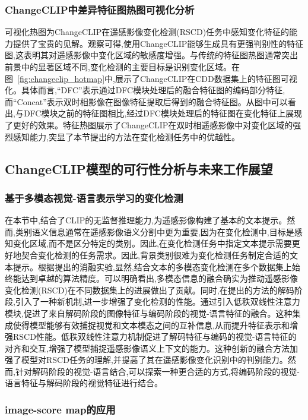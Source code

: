 \subsubsection{ChangeCLIP中差异特征图热图可视化分析}

可视化热图为ChangeCLIP在遥感影像变化检测(RSCD)任务中感知变化特征的能力提供了宝贵的见解。观察可得,使用ChangeCLIP能够生成具有更强判别性的特征图,这表明其对遥感影像中变化区域的敏感度增强。与传统的特征图热图通常突出前景中的显著区域不同,变化检测的主要目标是识别变化区域。在图~\ref{fig:changeclip_hotmap}中,展示了ChangeCLIP在CDD数据集上的特征图可视化。具体而言,``DFC''表示通过DFC模块处理后的融合特征图的编码部分特征,而``Concat''表示双时相影像在图像特征提取后得到的融合特征图。从图中可以看出,与DFC模块之前的特征图相比,经过DFC模块处理后的特征图在变化特征上展现了更好的效果。特征热图展示了ChangeCLIP在双时相遥感影像中对变化区域的强烈感知能力,突显了本节提出的方法在变化检测任务中的优越性。

\subsection{ChangeCLIP模型的可行性分析与未来工作展望}

\subsubsection{基于多模态视觉-语言表示学习的变化检测}

在本节中,结合了CLIP的无监督推理能力,为遥感影像构建了基本的文本提示。然而,类别语义信息通常在遥感影像语义分割中更为重要,因为在变化检测中,目标是感知变化区域,而不是区分特定的类别。因此,在变化检测任务中指定文本提示需要更好地契合变化检测的任务需求。因此,背景类别很难为变化检测任务制定合适的文本提示。根据提出的消融实验,显然,结合文本的多模态变化检测在多个数据集上始终能达到卓越的算法精度。可以明确看出,多模态信息的融合确实为推动遥感影像变化检测(RSCD)在不同数据集上的进展做出了贡献。同时,在提出的方法的解码阶段,引入了一种新机制,进一步增强了变化检测的性能。通过引入低秩双线性注意力模块,促进了来自解码阶段的图像特征与编码阶段的视觉-语言特征的融合。这种集成使得模型能够有效捕捉视觉和文本模态之间的互补信息,从而提升特征表示和增强RSCD性能。低秩双线性注意力机制促进了解码特征与编码的视觉-语言特征的对齐和交互,增强了模型捕捉遥感影像语义上下文的能力。这种创新的融合方法加强了模型对RSCD任务的理解,并提高了其在遥感影像变化识别中的判别能力。然而,针对解码阶段的视觉-语言结合,可以探索一种更合适的方式,将编码阶段的视觉-语言特征与解码阶段的视觉特征进行结合。

\subsubsection{image-score map的应用}

